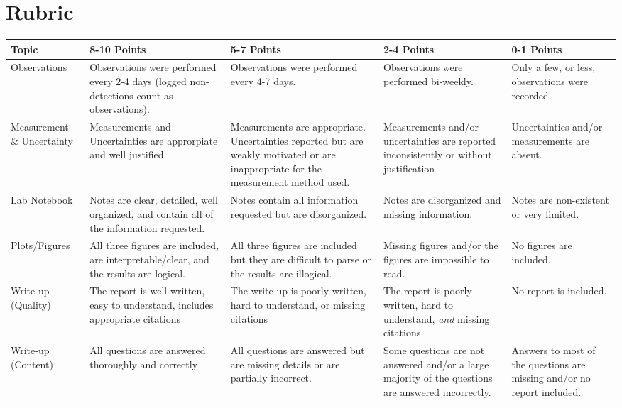 \documentclass[11pt]{article}
\begin{document}
\section*{Rubric}
\label{sec:orgc478e42}

\begin{center}
\begin{tabular}{|m{1in}|m{1in}|m{1in}|m{1in}|m{1in}|}
\hline
\textbf{Topic} & \textbf{8-10 Points} & \textbf{5-7 Points} & \textbf{2-4 Points} & \textbf{0-1 Points}\\[0pt]
\hline
Observations & Observations were performed every 2-4 days (logged non-detections count as observations). & Observations were performed every 4-7 days. & Observations were performed bi-weekly. & Only a few, or less, observations were recorded.\\[0pt]
\hline
Measurement \& Uncertainty & Measurements and Uncertainties are approrpiate and well justified. & Measurements are appropriate. Uncertainties reported but are weakly motivated or are inappropriate for the measurement method used. & Measurements and/or uncertainties are reported inconsistently or without justification & Uncertainties and/or measurements are absent.\\[0pt]
\hline
Lab Notebook & Notes are clear, detailed, well organized, and contain all of the information requested. & Notes contain all information requested but are disorganized. & Notes are disorganized and missing information. & Notes are non-existent or very limited.\\[0pt]
\hline
Plots/Figures & All three figures are included, are interpretable/clear, and the results are logical. & All three figures are included but they are difficult to parse or the results are illogical. & Missing figures and/or the figures are impossible to read. & No figures are included.\\[0pt]
\hline
Write-up (Quality) & The report is well written, easy to understand, includes appropriate citations & The write-up is poorly written, hard to understand, or missing citations & The report is poorly written, hard to understand, \emph{and} missing citations & No report is included.\\[0pt]
\hline
Write-up (Content) & All questions are answered thoroughly and correctly & All questions are answered but are missing details or are partially incorrect. & Some questions are not answered and/or a large majority of the questions are answered incorrectly. & Answers to most of the questions are missing and/or no report included.\\[0pt]
\hline
\end{tabular}
\end{center}
\end{document}
